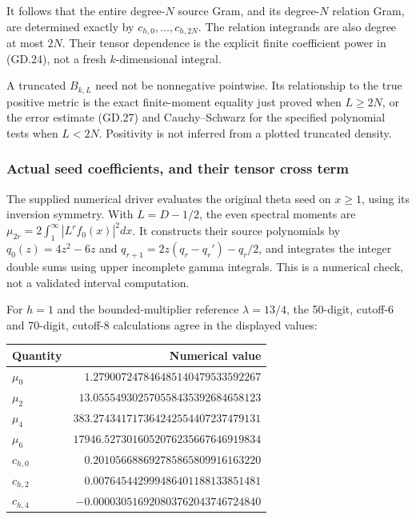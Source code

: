 It follows that the entire degree-\(N\) source Gram, and its
degree-\(N\) relation Gram, are determined exactly by
\(c_{h,0},\ldots,c_{h,2N}\). The relation integrands are also degree at
most \(2N\). Their tensor dependence is the explicit finite coefficient
power in (GD.24), not a fresh \(k\)-dimensional integral.

A truncated \(B_{k,L}\) need not be nonnegative pointwise. Its
relationship to the true positive metric is the exact finite-moment
equality just proved when \(L\ge2N\), or the error estimate (GD.27) and
Cauchy--Schwarz for the specified polynomial tests when \(L<2N\).
Positivity is not inferred from a plotted truncated density.

\subsubsection{Actual seed coefficients, and their tensor cross
term}\label{gammad-actual-seed-coefficients-and-their-tensor-cross-term}

The supplied numerical driver evaluates the original theta seed on
\(x\ge1\), using its inversion symmetry. With \(L=D-1/2\), the even
spectral moments are \(\mu_{2r}=2\int_1^\infty |L^rf_0(x)|^2dx\). It
constructs their source polynomials by \(q_0(z)=4z^2-6z\) and
\(q_{r+1}=2z(q_r-q_r')-q_r/2\), and integrates the integer double sums
using upper incomplete gamma integrals. This is a numerical check, not a
validated interval computation.

For \(h=1\) and the bounded-multiplier reference \(\lambda=13/4\), the
50-digit, cutoff-6 and 70-digit, cutoff-8 calculations agree in the
displayed values:

\begin{center}\begin{tabular}{@{}lr@{}}
\toprule
Quantity & Numerical value \\
\midrule
\(\mu_0\) & \(1.279007247846485140479533592267\) \\
\(\mu_2\) & \(13.055549302570558435392684658123\) \\
\(\mu_4\) & \(383.274341717364242554407237479131\) \\
\(\mu_6\) & \(17946.5273016052076235667646919834\) \\
\(c_{h,0}\) & \(0.201056688692785865809916163220\) \\
\(c_{h,2}\) & \(0.007645442999486401188133851481\) \\
\(c_{h,4}\) & \(-0.000030516920803762043746724840\) \\
\bottomrule\end{tabular}\end{center}

